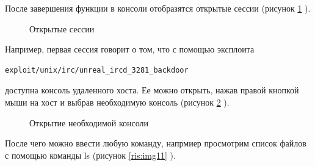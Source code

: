 \documentclass[10pt,a4paper]{report}
\begin{document}
После завершения функции в консоли отобразятся открытые сессии (рисунок \ref{ris:img9} ).\\
\begin{figure}[h]
\caption{Открытые сессии}
\label{ris:img9}  
\end{figure}
Например, первая сессия говорит о том, что с помощью эксплоита 
\begin{verbatim}
exploit/unix/irc/unreal_ircd_3281_backdoor
\end{verbatim}
 доступна консоль удаленного хоста. Ее можно открыть, нажав правой кнопкой мыши на хост и выбрав необходимую консоль (рисунок \ref{ris:img10} ).\\
\begin{figure}[h]
\caption{Открытие необходимой консоли}
\label{ris:img10}  
\end{figure}
После чего можно ввести любую команду, напрмиер просмотрим список файлов с помощью команды ls (рисунок \ref{ris:img11} ).\\
\end{document}
